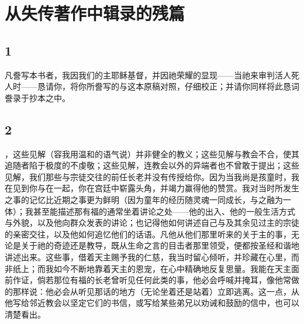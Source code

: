 
\chapter{从失传著作中辑录的残篇}



\section{1}

凡誊写本书者，我因我们的主耶稣基督，并因祂荣耀的显现——当祂来审判活人死人时——恳请你，将你所誊写的与这本原稿对照，仔细校正；并请你同样将此恳词誊录于抄本之中。\par


\section{2}

，这些见解（容我用温和的语气说）并非健全的教义；这些见解与教会不合，使其追随者陷于极度的不虔敬；这些见解，连教会以外的异端者也不曾敢于提出；这些见解，我们那些与宗徒交往的前任长老并没有传授给你。因为当我尚是孩童时，我在见到你与在一起，你在宫廷中崭露头角，并竭力赢得他的赞赏。我对当时所发生之事的记忆比近期之事更为鲜明（因为童年的经历随灵魂一同成长，与之融为一体）；我甚至能描述那有福的通常坐着讲论之处——他的出入、他的一般生活方式与外貌，以及他向群众发表的讲论；也记得他如何讲述自己与及其余见过主的宗徒的亲密交往，以及他如何追忆他们的话语。凡他从他们那里听来的关于主的事，无论是关于祂的奇迹还是教导，既从生命之言的目击者那里领受，便都按圣经和谐地讲述出来。这些事，借着天主赐予我的仁慈，我当时留心倾听，并珍藏在心里，而非纸上；而我如今不断地靠着天主的恩宠，在心中精确地反复思量。我能在天主面前作证，倘若那位有福的长老曾听见任何此类的事，他必会呼喊并掩耳，像他常做的那样说：他必会从听见那话的地方（无论坐着还是站着）立即逃离。这一点，从他写给邻近教会以坚定它们的书信，或写给某些弟兄以劝诫和鼓励的信中，也可以清楚看出。\par

